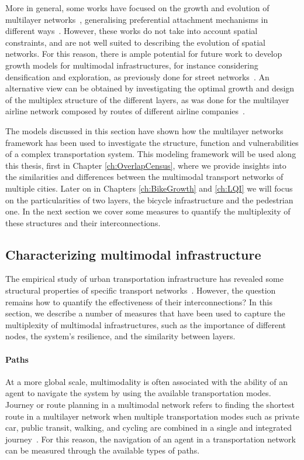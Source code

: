 More in general, some works have focused on the growth and evolution of multilayer networks~\cite{nicosia2013growing,kim2013coevolution,nicosia2014nonlinear}, generalising preferential attachment mechanisms in different ways~\cite{barabasi1999emergence}. However, these works do not take into account spatial constraints, and are not well suited to describing the evolution of spatial networks. For this reason, there is ample potential for future work to develop growth models for multimodal infrastructures, for instance considering densification and exploration, as previously done for street networks~\cite{strano2012evolution}. An alternative view can be obtained by investigating the optimal growth and design of the multiplex structure of the different layers, as was done for the multilayer airline network composed by routes of different airline companies~\cite{santoro2018pareto}. 

The models discussed in this section have shown how the multilayer networks framework has been used to investigate the structure, function and vulnerabilities of a complex transportation system. This modeling framework will be used along this thesis, first in Chapter \ref{ch:OverlapCensus}, where we provide insights into the similarities and differences between the multimodal transport networks of multiple cities. Later on in Chapters \ref{ch:BikeGrowth} and \ref{ch:LQI} we will focus on the particularities of two layers, the bicycle infrastructure and the pedestrian one. In the next section we cover some measures to quantify the multiplexity of these structures and their interconnections.  

\subsection{Characterizing multimodal infrastructure}\label{sec:measuresinfrastructure}

The empirical study of urban transportation infrastructure has revealed some structural properties of specific transport networks~\cite{barthelemy2011spatial}. However, the question remains how to quantify the effectiveness of their interconnections? In this section, we describe a number of measures that have been used to capture the multiplexity of multimodal infrastructures, such as the importance of different nodes, the system's resilience, and the similarity between layers.

\paragraph*{Paths} 
At a more global scale, multimodality is often associated with the ability of an agent to navigate the system by using the available transportation modes. Journey or route planning in a multimodal network refers to finding the shortest route in a multilayer network when multiple transportation modes such as private car, public transit, walking, and cycling are combined in a single and integrated journey~\cite{zografos2008algorithms,botea2013multi}. For this reason, the navigation of an agent in a transportation network can be measured through the available types of paths.

